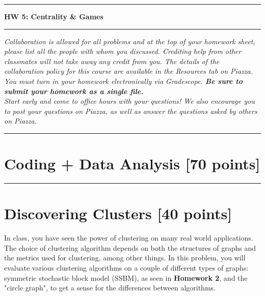 \documentclass[11pt]{article}
\begin{document}
\noindent \rule{\textwidth}{.5mm} \noindent {} \hfill {}

  \vspace{0.25cm}

\noindent \centerline{\bf {\Large HW 5: Centrality \& Games}}

\vspace{0.25cm}

\noindent {} \hfill
{} \noindent
\rule{\textwidth}{.5mm}


\noindent \textit{Collaboration is allowed for all problems and at the top of your homework sheet, please list all the people with whom you discussed. Crediting help from other classmates will not take away any credit from you. The details of the collaboration policy for this course are available in the Resources tab on Piazza.}\\

\noindent \textit{You must turn in your homework electronically via Gradescope. \textbf{Be sure to submit your homework as a single file.}}\\

\noindent \textit{Start early and come to office hours with your questions! We also encourage you to post your questions on Piazza, as well as answer the questions asked by others on Piazza.}

\noindent \rule{6in}{0.4pt}
\section*{Coding + Data Analysis [70 points]}
\rule{6in}{0.4pt}

\section{Discovering Clusters [40 points]}

\noindent In class, you have seen the power of clustering on many real world applications. The choice of clustering algorithm depends on both the structures of graphs and the metrics used for clustering, among other things. In this problem, you will evaluate various clustering algorithms on a couple of different types of graphs: symmetric stochastic block model (SSBM), as seen in \textbf{Homework 2}, and the "circle graph", to get a sense for the differences between algorithms. \\
\end{document}

